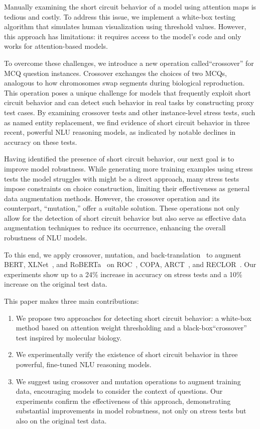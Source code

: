 Manually examining the short circuit behavior of a model using attention maps is tedious and costly. To address this issue, we implement a white-box testing algorithm that simulates human visualization using threshold values. However, this approach has limitations: it requires access to the model's code and only works for attention-based models.

To overcome these challenges, we introduce a new operation called``crossover'' for MCQ question instances. Crossover exchanges the choices of two MCQs, analogous to how chromosomes swap segments during biological reproduction. This operation poses a unique challenge for models that frequently exploit short circuit behavior and can detect such behavior in real tasks by constructing proxy test cases. By examining crossover tests and other instance-level stress tests, such as named entity replacement, we find evidence of short circuit behavior in three recent, powerful NLU reasoning models, as indicated by notable declines in accuracy on these tests.

Having identified the presence of short circuit behavior, our next goal is to improve model robustness. While generating more training examples using stress tests the model struggles with might be a direct approach, many stress tests impose constraints on choice construction, limiting their effectiveness as general data augmentation methods. However, the crossover operation and its counterpart, ``mutation,'' offer a suitable solution. These operations not only allow for the detection of short circuit behavior but also serve as effective data augmentation techniques to reduce its occurrence, enhancing the overall robustness of NLU models.

To this end, we apply
crossover, mutation, and back-translation~\cite{back2019} to augment BERT, XLNet~\cite{xlnet2019nips}, and RoBERTa~\cite{roberta2019} on ROC~\cite{roc2017}, COPA, ARCT~\cite{arct2018}, and RECLOR~\cite{yu2020reclor}. Our experiments show up to a 24\% increase in accuracy on stress tests and a 10\% increase on the original test data.

This paper makes three main contributions:

\begin{enumerate}
\item We propose two approaches for detecting short circuit behavior: a white-box method based on attention weight thresholding and a black-box``crossover'' test inspired by molecular biology.
\item We experimentally verify the existence of short circuit behavior in three powerful, fine-tuned NLU reasoning models.
\item We suggest using crossover and mutation operations to augment training data, encouraging models to consider the context of questions. Our experiments confirm the effectiveness of this approach, demonstrating substantial improvements in model robustness, not only on stress tests but also on the original test data.
\end{enumerate}
